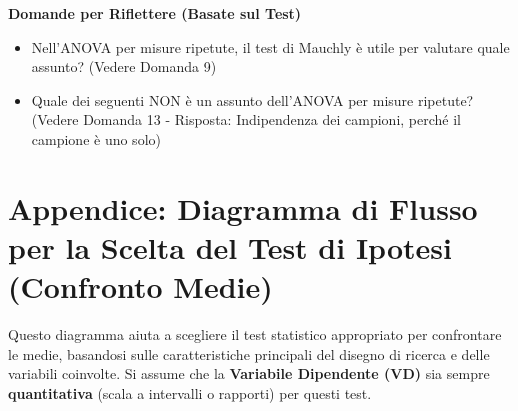 \documentclass[12pt, a4paper]{article}
\newenvironment{reflectionbox}{%
    \medskip
    \begin{framed}\par\noindent
    \textbf{\color{boxtitlecolor}Domande per Riflettere (Basate sul Test)} \par
    \begin{itemize}[leftmargin=*, label=$\blacktriangleright$]
}{%
    \end{itemize}\par
    \end{framed}
    \medskip
}
\begin{document}
\begin{reflectionbox}
    \item Nell'ANOVA per misure ripetute, il test di Mauchly è utile per valutare quale assunto? (Vedere Domanda 9)
    \item Quale dei seguenti NON è un assunto dell'ANOVA per misure ripetute? (Vedere Domanda 13 - Risposta: Indipendenza dei campioni, perché il campione è uno solo)
\end{reflectionbox}


\newpage %
\appendix
\section*{Appendice: Diagramma di Flusso per la Scelta del Test di Ipotesi (Confronto Medie)}
\label{sec:appendice_flowchart}

Questo diagramma aiuta a scegliere il test statistico appropriato per confrontare le medie, basandosi sulle caratteristiche principali del disegno di ricerca e delle variabili coinvolte. Si assume che la \textbf{Variabile Dipendente (VD)} sia sempre \textbf{quantitativa} (scala a intervalli o rapporti) per questi test.
\end{document}
